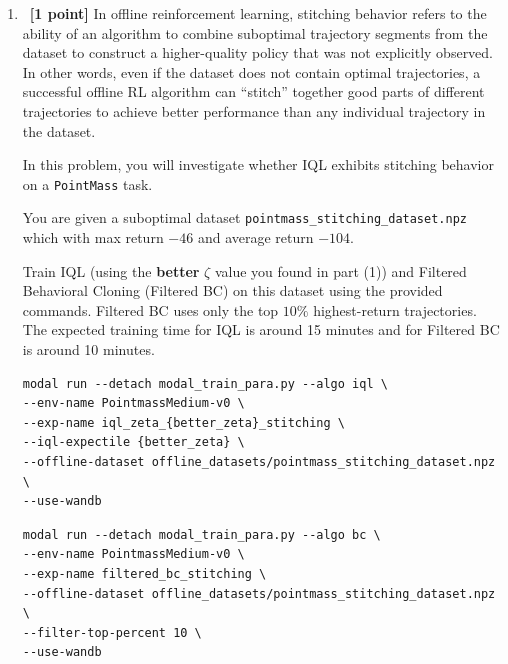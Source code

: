 \documentclass[12pt]{article}
\begin{document}
\begin{enumerate}
{Explanation:
}

\item~\textbf{[1 point]} In offline reinforcement learning, stitching behavior refers to the ability of an algorithm to combine suboptimal trajectory segments from the dataset to construct a higher-quality policy that was not explicitly observed. In other words, even if the dataset does not contain optimal trajectories, a successful offline RL algorithm can ``stitch'' together good parts of different trajectories to achieve better performance than any individual trajectory in the dataset.

In this problem, you will investigate whether IQL exhibits stitching behavior on a \texttt{PointMass} task.

You are given a suboptimal dataset \texttt{pointmass\_stitching\_dataset.npz} which with max return $-46$ and average return $-104$. 

Train IQL (using the \textbf{better} $\zeta$ value you found in part (1)) and Filtered Behavioral Cloning (Filtered BC) on this dataset using the provided commands. Filtered BC uses only the top $10\%$ highest-return trajectories. The expected training time for IQL is around 15 minutes and for Filtered BC is around 10 minutes.

\begin{tcolorbox}[width=\linewidth, sharp corners=all, colback=white!95!black]
\begin{verbatim}
modal run --detach modal_train_para.py --algo iql \
--env-name PointmassMedium-v0 \
--exp-name iql_zeta_{better_zeta}_stitching \
--iql-expectile {better_zeta} \
--offline-dataset offline_datasets/pointmass_stitching_dataset.npz \
--use-wandb
\end{verbatim}
\end{tcolorbox}

\begin{tcolorbox}[width=\linewidth, sharp corners=all, colback=white!95!black]
\begin{verbatim}
modal run --detach modal_train_para.py --algo bc \
--env-name PointmassMedium-v0 \
--exp-name filtered_bc_stitching \
--offline-dataset offline_datasets/pointmass_stitching_dataset.npz \
--filter-top-percent 10 \
--use-wandb
\end{verbatim}
\end{tcolorbox}



\end{enumerate}
\end{document}
